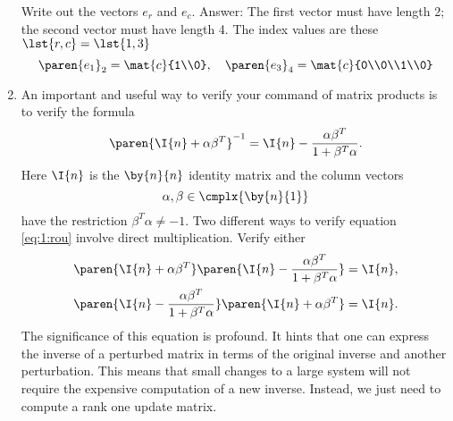 \begin{enumerate}
\subitem Write out the vectors $e_{r}$ and $e_{c}$.
\subitem Answer: The first vector must have length 2; the second vector must have length 4. The index values are these $\lst{r,c} = \lst{1,3}$
\begin{equation*}
  \paren{e_{1}}_{2} =\mat{c}{1\\0}, \quad \paren{e_{3}}_{4}= \mat{c}{0\\0\\1\\0}
\end{equation*}
\item An important and useful way to verify your command of 	matrix products is to verify the formula
\begin{equation}
 \paren{\I{n}+\alpha \beta^{T}}^{-1} = \I{n} - \frac{\alpha \beta^{T}}{1+\beta^{T}\alpha}.
 \label{eq:1:rou}
\end{equation}
Here $\I{n}$ is the $\by{n}{n}$ identity matrix and the column vectors
\begin{equation}
  \alpha, \beta \in \cmplx{\by{n}{1}}
\end{equation}
have the restriction $\beta^{T}\alpha\ne-1$.
Two different ways to verify equation \eqref{eq:1:rou} involve direct multiplication. Verify either
\begin{equation}
  \begin{split}
    \paren{\I{n}+\alpha \beta^{T}}\paren{\I{n} - \frac{\alpha \beta^{T}}{1+\beta^{T}\alpha}} &= \I{n},\\
    \paren{\I{n} - \frac{\alpha \beta^{T}}{1+\beta^{T}\alpha}}\paren{\I{n}+\alpha \beta^{T}} &= \I{n}.
  \end{split}
\end{equation}
The significance of this equation is profound. It hints that one can express the inverse of a perturbed matrix in terms of the original inverse and another perturbation. This means that small changes to a large system will not require the expensive computation of a new inverse. Instead, we just need to compute a rank one update matrix.


\end{enumerate}

